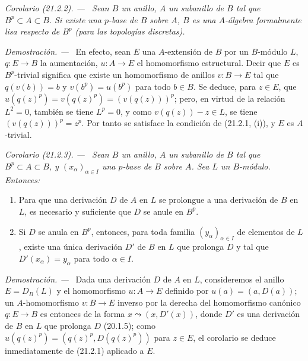 \documentclass[10pt,oneside]{book}
\makeatletter
\newcommand{\setmanualcurrentlabel}[1]{\def\@currentlabel{#1}}
\newenvironment{corollary}[1][]{%
  \setmanualcurrentlabel{#1}\par\medskip\noindent\itshape Corolario (#1). ---\ }{\par}
\newenvironment{proof}{%
  \par\medskip\noindent\textit{Demostración. ---\ }}{\par}
\providecommand{\setmin}{-}%
\makeatother
\begin{document}
\begin{corollary}[21.2.2]
\label{0.21.2.2-es}
Sean $B$ un anillo, $A$ un subanillo de $B$ tal que $B^p\subset A\subset B$.
Si existe una $p$-base de $B$ sobre $A$, $B$ es una $A$-álgebra formalmente
lisa respecto de $B^p$ (para las topologías discretas).
\end{corollary}

\begin{proof}
En efecto, sean $E$ una $A$-extensión de $B$ por un $B$-módulo $L$, $q:E\to B$ la
aumentación, $u:A\to E$ el homomorfismo estructural. Decir que $E$ es
$B^p$-trivial significa que existe un homomorfismo de anillos $v:B\to E$
tal que $q(v(b))=b$ y $v(b^p)=u(b^p)$ para todo $b\in B$. Se deduce, para
$z\in E$, que $u(q(z)^p)=v(q(z)^p)=(v(q(z)))^p$; pero, en virtud de la
relación $L^2=0$, también se tiene $L^p=0$, y como $v(q(z))\setmin z\in L$, se
tiene $(v(q(z)))^p=z^p$. Por tanto se satisface la condición de (21.2.1, (i)), y $E$ es $A$-trivial.
\end{proof}

\begin{corollary}[21.2.3]
\label{0.21.2.3-es}
Sean $B$ un anillo, $A$ un subanillo de $B$ tal que $B^p\subset A\subset B$,
y $\left(x_\alpha\right)_{\alpha\in I}$ una $p$-base de $B$ sobre $A$. Sea
$L$ un $B$-módulo. Entonces:
\begin{enumerate}
  \item[\textup{(i)}] Para que una derivación $D$ de $A$ en $L$ se prolongue a una
  derivación de $B$ en $L$, es necesario y suficiente que $D$ se anule en
  $B^p$.
  \item[\textup{(ii)}] Si $D$ se anula en $B^p$, entonces, para toda familia
  $(y_\alpha)_{\alpha\in I}$ de elementos de $L$, existe una única derivación
  $D'$ de $B$ en $L$ que prolonga $D$ y tal que
  $D'(x_\alpha)=y_\alpha$ para todo $\alpha\in I$.
\end{enumerate}
\end{corollary}

\begin{proof}
Dada una derivación $D$ de $A$ en $L$, consideremos el anillo $E=D_B(L)$ y
el homomorfismo $u:A\to E$ definido por $u(a)=(a,D(a))$; un
$A$-homomorfismo $v:B\to E$ inverso por la derecha del homomorfismo canónico
$q:E\to B$ es entonces de la forma $x\leadsto(x,D'(x))$, donde $D'$ es una
derivación de $B$ en $L$ que prolonga $D$ (20.1.5); como
$u(q(z)^p)=(q(z)^p,D(q(z)^p))$ para $z\in E$, el corolario se deduce
inmediatamente de (21.2.1) aplicado a $E$.
\end{proof}
\end{document}
